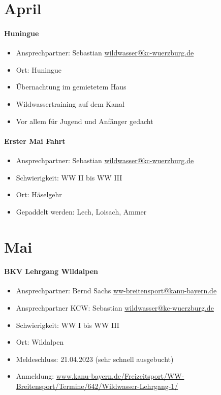 \documentclass[12pt, a4paper]{report}
\begin{document}
\section*{April}\paragraph{Huningue}
\begin{itemize}
    \item Ansprechpartner: Sebastian \href{mailto:wildwasser@kc-wuerzburg.de}{wildwasser@kc-wuerzburg.de}
    \item Ort: Huningue
    \item Übernachtung im gemietetem Haus
    \item Wildwassertraining auf dem Kanal
    \item Vor allem für Jugend und Anfänger gedacht
\end{itemize}

\paragraph{Erster Mai Fahrt}
\begin{itemize}
    \item Ansprechpartner: Sebastian \href{mailto:wildwasser@kc-wuerzburg.de}{wildwasser@kc-wuerzburg.de}
    \item Schwierigkeit: WW II bis WW III
    \item Ort: Häselgehr
    \item Gepaddelt werden: Lech, Loisach, Ammer
\end{itemize}

\section*{Mai}\paragraph{BKV Lehrgang Wildalpen}
\begin{itemize}
    \item Ansprechpartner: Bernd Sachs \href{mailto:ww-breitensport@kanu-bayern.de}{ww-breitensport@kanu-bayern.de}
    \item Ansprechpartner KCW: Sebastian \href{mailto:wildwasser@kc-wuerzburg.de}{wildwasser@kc-wuerzburg.de}
    \item Schwierigkeit: WW I bis WW III
    \item Ort: Wildalpen
    \item Meldeschluss: 21.04.2023 (sehr schnell ausgebucht)
    \item Anmeldung: \url{www.kanu-bayern.de/Freizeitsport/WW-Breitensport/Termine/642/Wildwasser-Lehrgang-1/}
\end{itemize}
\end{document}
